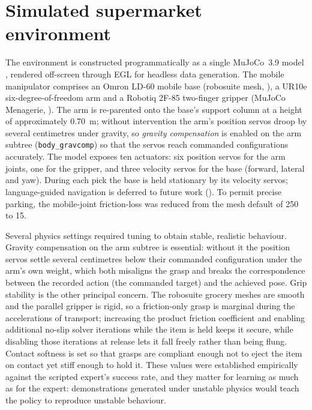 \section{Simulated supermarket environment}
\label{sec:m-env}
The environment is constructed programmatically as a single MuJoCo~3.9 model
\parencite{todorov2012mujoco}, rendered off-screen through EGL for headless data
generation. The mobile manipulator comprises an Omron LD-60 mobile base
(robosuite mesh, \parencite{zhu2020robosuite}), a UR10e six-degree-of-freedom arm and a
Robotiq 2F-85 two-finger gripper (MuJoCo Menagerie,
\parencite{deepmind2022menagerie}). The arm is re-parented onto the base's
support column at a height of approximately \SI{0.70}{m}; without intervention the
arm's position servos droop by several centimetres under gravity, so
\emph{gravity compensation} is enabled on the arm subtree
(\texttt{body\_gravcomp}) so that the servos reach commanded configurations
accurately. The model exposes ten actuators: six position servos for the arm
joints, one for the gripper, and three velocity servos for the base
(forward, lateral and yaw). During each pick the base is held stationary by its
velocity servos; language-guided navigation is deferred to future work
(). To permit precise parking, the mobile-joint friction-loss
was reduced from the mesh default of 250 to 15.

Several physics settings required tuning to obtain stable, realistic behaviour.
Gravity compensation on the arm subtree is essential: without it the position servos
settle several centimetres below their commanded configuration under the arm's own
weight, which both misaligns the grasp and breaks the correspondence between the
recorded action (the commanded target) and the achieved pose. Grip stability is the
other principal concern. The robosuite grocery meshes are smooth and the parallel
gripper is rigid, so a friction-only grasp is marginal during the accelerations of
transport; increasing the product friction coefficient and enabling additional
no-slip solver iterations while the item is held keeps it secure, while disabling those
iterations at release lets it fall freely rather than being flung. Contact softness is
set so that grasps are compliant enough not to eject the item on contact yet stiff
enough to hold it. These values were established empirically against the scripted
expert's success rate, and they matter for learning as much as for the expert:
demonstrations generated under unstable physics would teach the policy to reproduce
unstable behaviour.

